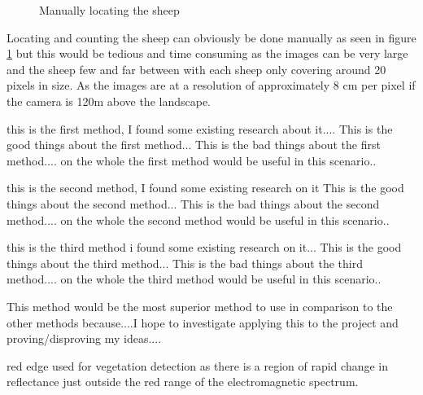 \begin{figure}[H]
    \centering
    \caption{Manually locating the sheep}
    \label{fig:manual}
\end{figure}

Locating and counting the sheep can obviously be done manually as seen in figure \ref{fig:manual} but this would be tedious and time consuming as the images can be very large and the sheep few and far between with each sheep only covering around 20 pixels in size. As the images are at a resolution of approximately 8 cm per pixel if the camera is  120m above the landscape.\cite{rededge}

this is the first method, I found some existing research about it....
This is the good things about the first method...
This is the bad things about the first method....
on the whole the first method would be useful in this scenario..

this is the second method, I found some existing research on it
This is the good things about the second method...
This is the bad things about the second method....
on the whole the second method would be useful in this scenario..

this is the third method i found some existing research on it...
This is the good things about the third method...
This is the bad things about the third  method....
on the whole the third method would be useful in this scenario..

This method would be the most superior method to use in comparison to the other methods because....I hope to investigate applying this to the project and proving/disproving my ideas....


red edge used for vegetation detection as there is a region of rapid change in reflectance just outside the red range of the electromagnetic spectrum.


